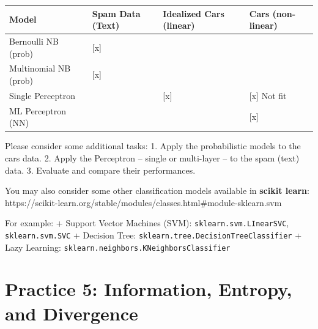 \documentclass[
  letterpaper,
]{scrbook}
\newcounter{none} %
\begin{document}
{\def\LTcaptype{none} %
\begin{longtable}[]{@{}
  >{\raggedright\arraybackslash}p{}
  >{\centering\arraybackslash}p{}
  >{\centering\arraybackslash}p{}
  >{\centering\arraybackslash}p{}@{}}
\toprule\noalign{}
\begin{minipage}[b]{\linewidth}\raggedright
Model
\end{minipage} & \begin{minipage}[b]{\linewidth}\centering
Spam Data (Text)
\end{minipage} & \begin{minipage}[b]{\linewidth}\centering
Idealized Cars (linear)
\end{minipage} & \begin{minipage}[b]{\linewidth}\centering
Cars (non-linear)
\end{minipage} \\
\midrule\noalign{}
\endhead
\bottomrule\noalign{}
\endlastfoot
Bernoulli NB (prob) & {[}x{]} & & \\
Multinomial NB (prob) & {[}x{]} & & \\
Single Perceptron & & {[}x{]} & {[}x{]} Not fit \\
ML Perceptron (NN) & & & {[}x{]} \\
\end{longtable}
}

Please consider some additional tasks: 1. Apply the probabilistic models
to the cars data. 2. Apply the Perceptron -- single or multi-layer -- to
the spam (text) data. 3. Evaluate and compare their performances.

You may also consider some other classification models available in
\textbf{scikit learn}:
https://scikit-learn.org/stable/modules/classes.html\#module-sklearn.svm

For example: + Support Vector Machines (SVM):
\texttt{sklearn.svm.LInearSVC}, \texttt{sklearn.svm.SVC} + Decision
Tree: \texttt{sklearn.tree.DecisionTreeClassifier} + Lazy Learning:
\texttt{sklearn.neighbors.KNeighborsClassifier}

\chapter*{Practice 5: Information, Entropy, and
Divergence}\label{ch-practice-05}
\end{document}

